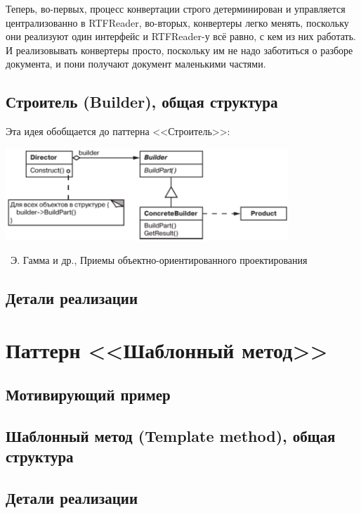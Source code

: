 \documentclass[a5paper]{article}
\newcommand{\attribution}[1] {
    \vspace{-5mm}\begin{flushright}\begin{scriptsize}%
    {\textcopyright\, #1}\end{scriptsize}\end{flushright}
}
\begin{document}
Теперь, во-первых, процесс конвертации строго детерминирован и управляется централизованно в RTFReader, во-вторых, конвертеры легко менять, поскольку они реализуют один интерфейс и RTFReader-у всё равно, с кем из них работать. И реализовывать конвертеры просто, поскольку им не надо заботиться о разборе документа, и пони получают документ маленькими частями.

\subsection{Строитель (Builder), общая структура}

Эта идея обобщается до паттерна <<Строитель>>:

\begin{center}
    \includegraphics[width=0.8\textwidth]{builder.png}
    \attribution{Э. Гамма и др., Приемы объектно-ориентированного проектирования}
\end{center}

\subsection{Детали реализации}



\section{Паттерн <<Шаблонный метод>>}

\subsection{Мотивирующий пример}

\subsection{Шаблонный метод (Template method), общая структура}

\subsection{Детали реализации}
\end{document}
